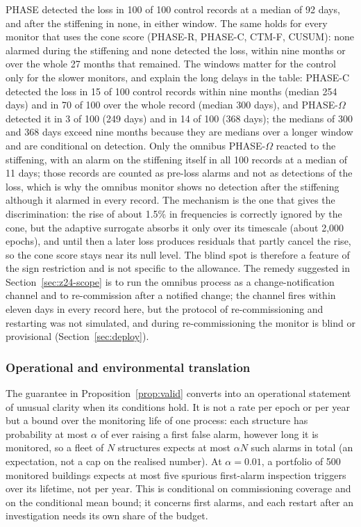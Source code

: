 \documentclass[12pt,a4paper]{article}
\newcommand{\rev}[1]{#1}
\newenvironment{revblock}{}{}
\newcommand{\rev}[1]{{\color{revcol}#1}}
\newenvironment{revblock}{\begingroup\color{revcol}}{\endgroup}
\newcommand{\rtwo}[1]{#1}
\newcommand{\rtwo}[1]{{\color{revcolb}#1}}
\begin{document}
\begin{revblock}
\rtwo{PHASE detected the loss in 100 of 100 control records at a median of 92 days, and after the stiffening in none, in either window.} \rtwo{The same holds for every monitor that uses the cone score (PHASE-R, PHASE-C, CTM-F, CUSUM): none alarmed during the stiffening and none detected the loss, within nine months or over the whole 27 months that remained.} \rtwo{The windows matter for the control only for the slower monitors, and explain the long delays in the table: PHASE-C detected the loss in 15 of 100 control records within nine months (median 254 days) and in 70 of 100 over the whole record (median 300 days), and PHASE-$\Omega$ detected it in 3 of 100 (249 days) and in 14 of 100 (368 days); the medians of 300 and 368 days exceed nine months because they are medians over a longer window and are conditional on detection.} \rtwo{Only the omnibus PHASE-$\Omega$ reacted to the stiffening, with an alarm on the stiffening itself in all 100 records at a median of 11 days; those records are counted as pre-loss alarms and not as detections of the loss, which is why the omnibus monitor shows no detection after the stiffening although it alarmed in every record.} The mechanism is the one that gives the discrimination: the rise of about 1.5\% in frequencies is correctly ignored by the cone, but the adaptive surrogate absorbs it only over its timescale (about 2{,}000 epochs), and until then a later loss produces residuals that partly cancel the rise, so the cone score stays near its null level. The blind spot is therefore a feature of the sign restriction and is not specific to the allowance. The remedy suggested in Section~\ref{sec:z24-scope} is to run the omnibus process as a change-notification channel and to re-commission after a notified change; the channel fires within eleven days in every record here, but the protocol of re-commissioning and restarting was not simulated, and during re-commissioning the monitor is blind or provisional (Section~\ref{sec:deploy}).
\end{revblock}

\subsubsection{Operational and environmental translation}\label{sec:res-oper}

The guarantee in Proposition~\ref{prop:valid} converts into an operational statement of unusual clarity \rev{when its conditions hold}. It is not a rate per epoch or per year but a bound over the monitoring life of one process: each structure has probability at most $\alpha$ of ever raising a \rev{first} false alarm, however long it is monitored, so \rev{a fleet of $N$ structures expects at most $\alpha N$ such alarms in total (an expectation, not a cap on the realised number)}. At $\alpha=0.01$, a portfolio of 500 monitored buildings expects at most five spurious \rev{first-alarm} inspection triggers over its lifetime, not per year. \rev{This is conditional on commissioning coverage and on the conditional mean bound; it concerns first alarms, and each restart after an investigation needs its own share of the budget.}
\end{document}
